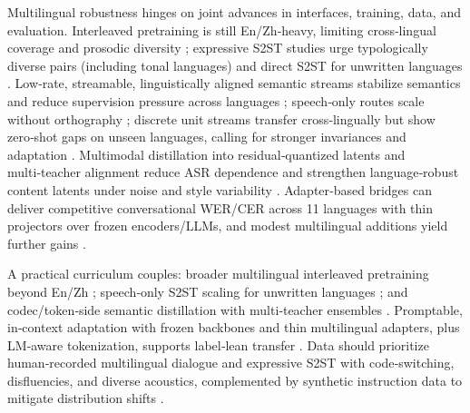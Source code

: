 \documentclass{article}
\begin{document}
Multilingual robustness hinges on joint advances in interfaces, training, data, and evaluation. Interleaved pretraining is still En/Zh‑heavy, limiting cross‑lingual coverage and prosodic diversity \cite{zeng2024scalingspeechtextpretrainingsyntheticint}; expressive S2ST studies urge typologically diverse pairs (including tonal languages) and direct S2ST for unwritten languages \cite{huang2023holisticcascadesystembenchmarkhumanevalu}. Low‑rate, streamable, linguistically aligned semantic streams stabilize semantics and reduce supervision pressure across languages \cite{tseng2025tastetextalignedspeechtokenizationembedd}; speech‑only routes scale without orthography \cite{peng2024mslms2stmultitaskspeechlanguagemodeltext}; discrete unit streams transfer cross‑lingually but show zero‑shot gaps on unseen languages, calling for stronger invariances and adaptation \cite{hsu2024exploringcontextlearningtextlessspeechla}. Multimodal distillation into residual‑quantized latents and multi‑teacher alignment reduce ASR dependence and strengthen language‑robust content latents under noise and style variability \cite{ahasan2025dmcodecdistillingmultimodalrepresentatio}. Adapter‑based bridges can deliver competitive conversational WER/CER across 11 languages with thin projectors over frozen encoders/LLMs, and modest multilingual additions yield further gains \cite{li2025transsionmultilingualspeechrecognitionsy}.

A practical curriculum couples: broader multilingual interleaved pretraining beyond En/Zh \cite{zeng2024scalingspeechtextpretrainingsyntheticint}; speech‑only S2ST scaling for unwritten languages \cite{peng2024mslms2stmultitaskspeechlanguagemodeltext}; and codec/token‑side semantic distillation with multi‑teacher ensembles \cite{ahasan2025dmcodecdistillingmultimodalrepresentatio}. Promptable, in‑context adaptation with frozen backbones and thin multilingual adapters, plus LM‑aware tokenization, supports label‑lean transfer \cite{hsu2024exploringcontextlearningtextlessspeechla,turetzky2024lastlanguagemodelawarespeechtokenization,wang2023slmbridgethingapbetweenspeechtextfoundat,xu2025optimaltransportregularizationspeechtext}. Data should prioritize human‑recorded multilingual dialogue and expressive S2ST with code‑switching, disfluencies, and diverse acoustics, complemented by synthetic instruction data to mitigate distribution shifts \cite{shu2023llasmlargelanguagespeechmodel,zeng2024scalingspeechtextpretrainingsyntheticint,huang2023holisticcascadesystembenchmarkhumanevalu,ahasan2025dmcodecdistillingmultimodalrepresentatio}.
\end{document}
